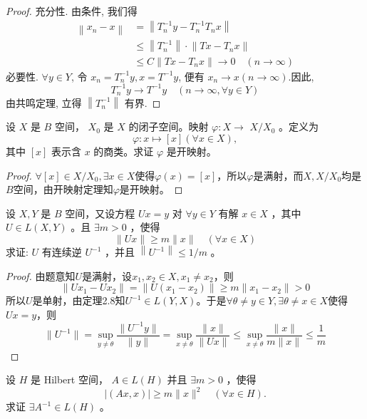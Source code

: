 \documentclass[lang=cn,newtx,10pt,scheme=chinese,thmcnt=chapter]{elegantbook}
\begin{document}
\begin{proof}
 充分性. 由条件, 我们得
\begin{equation*}
\begin{aligned}
\left\|x_n-x\right\| & =\left\|T_n^{-1} y-T_n^{-1} T_n x\right\| \\
& \leqslant\left\|T_n^{-1}\right\| \cdot\left\|T x-T_n x\right\| \\
& \leqslant C\left\|T x-T_n x\right\| \rightarrow 0 \quad(n \rightarrow \infty)
\end{aligned}
\end{equation*}
必要性. $\forall y \in Y$, 令 $x_n=T_n^{-1} y, x=T^{-1} y$, 便有 $x_n \rightarrow x(n \rightarrow \infty)$.因此,
\begin{equation*}
T_n^{-1} y \rightarrow T^{-1} y \quad(n \rightarrow \infty, \forall y \in Y )
\end{equation*}
由共鸣定理, 立得 $\left\|T_n^{-1}\right\|$ 有界.

\end{proof}

\begin{problem}
设 ${X}$ 是 $B$ 空间， ${X}_0$ 是 ${X}$ 的闭子空间。映射 $\varphi: {X} \rightarrow$ ${X} / { X }_0$ 。定义为
\begin{equation*}
\varphi: x \mapsto[x](\forall x \in {X} ),
\end{equation*}
其中 $[x]$ 表示含 $x$ 的商类。求证 $\varphi$ 是开映射。
\end{problem}
\begin{proof}
    $\forall [x]\in {X}/{X}_0,\exists x\in {X}$使得$\varphi(x)=[x] $，所以$\varphi$是满射，而${X},{X}/{X}_0$均是$B$空间，由开映射定理知$\varphi$是开映射。
\end{proof}
\begin{problem}
设 ${X} , {Y}$ 是 $B$ 空间，又设方程 $U x=y$ 对 $\forall y \in {Y}$ 有解 $x \in {X}$ ，其中 $U \in {L} ( {X}, {Y} )$ 。且 $\exists m>0$ ，使得
\begin{equation*}
\|U x\| \geqslant m\|x\| \quad(\forall x \in {X}) 
\end{equation*}
求证: $U$ 有连续逆 $U^{-1}$ ，并且 $\left\|U^{-1}\right\| \leqslant 1 / m$ 。
\end{problem}
\begin{proof}
    由题意知$U$是满射，设$x_1,x_2\in{X} ,x_1\neq x_2$，则
    \[\|Ux_1-Ux_2\|=\|U(x_1-x_2)\|\geqslant m\|x_1-x_2\|>0
    \]
    所以$U$是单射，由定理2.8知$U^{-1}\in {L}({Y},{X})$。于是$\forall\theta\neq y\in {Y},\exists\theta\neq x\in{X} $使得$Ux=y$，则
    \[\|U^{-1}\|=\sup\limits_{y\neq \theta }\frac{\|U^{-1}y\|}{\|y\|}=\sup\limits_{x\neq \theta }\frac{\|x\|}{\|Ux\|}\leqslant\sup\limits_{x\neq \theta }\frac{\|x\|}{m\|x\|}\leqslant \frac{1}{m}\]
    \end{proof}
\begin{problem}
 设 $H$ 是 Hilbert 空间， $A \in {L} (H)$ 并且 $\exists m>0$ ，使得
\begin{equation*}
|(A x, x)| \geqslant m\|x\|^2 \quad(\forall x \in H) .
\end{equation*}
求证 $\exists A^{-1} \in {L} (H)$ 。
\end{problem}
\end{document}
